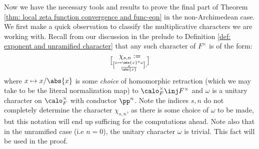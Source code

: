 \documentclass[11pt, x11names, openany]{book}
\begin{document}
Now we have the necessary tools and results to prove the final part of Theorem \ref{thm: local zeta function convergence and func-eqn} in the non-Archimedean case. We first make a quick observation to classify the multiplicative characters we are working with. Recall from our discussion in the prelude to Definition \ref{def: exponent and unramified character} that any such character of $F^\times$ is of the form:
\begin{equation*}
    \chi_{s, n} := \brack{x \mapsto \abs{x}^s \omega \brack{\frac{x}{\abs{x}}}},
\end{equation*}
where $x \mapsto x/\abs{x}$ is some \textit{choice} of homomorphic retraction (which we may take to be the literal normalization map) to $\calo_F^\times \inj F^\times$ and $\omega$ is a unitary character on $\calo_F^\times$ with conductor $\pp^n$. Note the indices $s, n$ do not completely determine the character $\chi_{s, n}$, as there is some choice of $\omega$ to be made, but this notation will end up sufficing for the computations ahead. Note also that in the unramified case (i.e $n=0$), the unitary character $\omega$ is trivial. This fact will be used in the proof.
\end{document}
